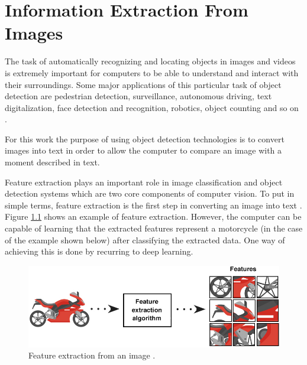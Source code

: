 \cleardoublepage


\chapter{Information Extraction From Images}
\label{ch:computervision}



The task of automatically recognizing and locating objects in images and videos is extremely important for computers to be able to understand and interact with their surroundings. Some major applications of this particular task of object detection are pedestrian detection, surveillance, autonomous driving, text digitalization, face detection and recognition, robotics, object counting and so on \cite{Agarwal2019}. 

For this work the purpose of using object detection technologies is to convert images into text in order to allow the computer to compare an image with a moment described in text.

Feature extraction plays an important role in image classification and object detection systems which are two core components of computer vision. To put in simple terms, feature extraction is the first step in converting an image into text \cite{Tiwari2013}. Figure \ref{fig:feature_extraction} shows an example of feature extraction. However, the computer can be capable of learning that the extracted features represent a motorcycle (in the case of the example shown below) after classifying the extracted data. One way of achieving this is done by recurring to deep learning.





\begin{figure}[H]
    \centering
    \includegraphics[scale = 0.55]{Sections/2StateOfTheArt/2_images/Feature_extraction.png}
    \caption[Feature extraction from an image.]{Feature extraction from an image \cite{feature}.}  
    \label{fig:feature_extraction}
\end{figure}


